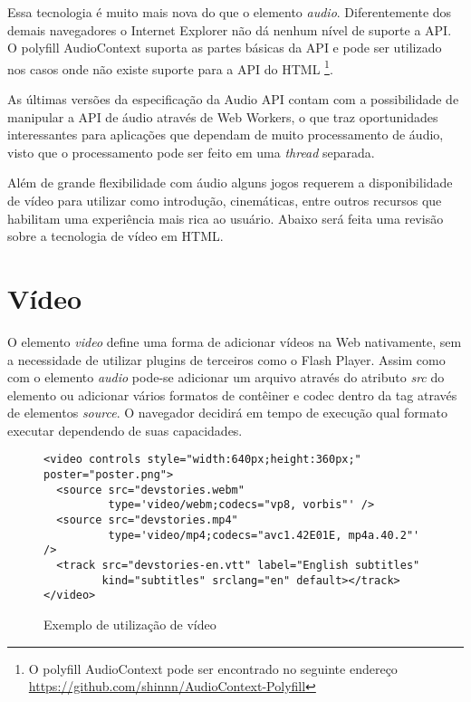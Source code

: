 Essa tecnologia é muito mais nova do que o elemento \textit{audio}.
Diferentemente dos demais navegadores o Internet Explorer não
dá nenhum nível de suporte a API. O polyfill AudioContext
suporta as partes básicas da API e pode ser utilizado nos
casos onde não existe suporte para a API do HTML \footnote{O
polyfill AudioContext pode ser encontrado no seguinte endereço
\url{https://github.com/shinnn/AudioContext-Polyfill}}.

As últimas versões da especificação da Audio API contam com a
possibilidade de manipular a API de áudio através de Web Workers, o
que traz oportunidades interessantes para aplicações que dependam de
muito processamento de áudio, visto que o processamento pode ser
feito em uma \textit{thread} separada.

Além de grande flexibilidade com áudio alguns jogos requerem a
disponibilidade de vídeo para utilizar como introdução, cinemáticas,
entre outros recursos que habilitam uma experiência mais rica ao
usuário. Abaixo será feita uma revisão sobre a tecnologia de vídeo
em HTML.

\section{Vídeo}

O elemento \textit{video} define uma forma de adicionar vídeos na
Web nativamente, sem a necessidade de utilizar plugins de terceiros
como o Flash Player. Assim como com o elemento \textit{audio} pode-se
adicionar um arquivo através do atributo \textit{src} do elemento
ou adicionar vários formatos de contêiner e codec dentro da tag
através de elementos \textit{source}. O navegador decidirá em tempo de
execução qual formato executar dependendo de suas capacidades.

\begin{figure}[H]
\centering
\begin{verbatim}
<video controls style="width:640px;height:360px;" poster="poster.png">
  <source src="devstories.webm" 
          type='video/webm;codecs="vp8, vorbis"' />
  <source src="devstories.mp4" 
          type='video/mp4;codecs="avc1.42E01E, mp4a.40.2"' />
  <track src="devstories-en.vtt" label="English subtitles" 
         kind="subtitles" srclang="en" default></track>
</video>
\end{verbatim}
\caption{Exemplo de utilização de vídeo}
\label{fig:video}
\end{figure}

